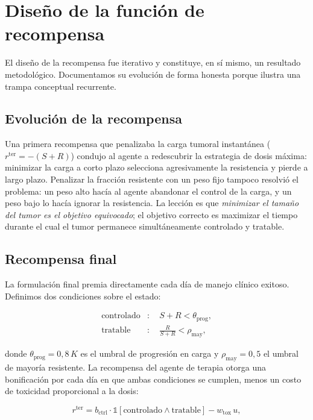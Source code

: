 \section{Diseño de la función de recompensa}
\label{sec:recompensa}

El diseño de la recompensa fue iterativo y constituye, en sí mismo, un resultado metodológico. Documentamos su evolución de forma honesta porque ilustra una trampa conceptual recurrente.

\subsection{Evolución de la recompensa}

Una primera recompensa que penalizaba la carga tumoral instantánea ($r^{\text{ter}} = -(S+R)$) condujo al agente a redescubrir la estrategia de dosis máxima: minimizar la carga a corto plazo selecciona agresivamente la resistencia y pierde a largo plazo. Penalizar la fracción resistente con un peso fijo tampoco resolvió el problema: un peso alto hacía al agente abandonar el control de la carga, y un peso bajo lo hacía ignorar la resistencia. La lección es que \emph{minimizar el tamaño del tumor es el objetivo equivocado}; el objetivo correcto es maximizar el tiempo durante el cual el tumor permanece simultáneamente controlado y tratable.

\subsection{Recompensa final}

La formulación final premia directamente cada día de manejo clínico exitoso. Definimos dos condiciones sobre el estado:

\begin{align}
  \text{controlado} &: \quad S + R < \theta_{\text{prog}}, \label{eq:controlado}\\
  \text{tratable}   &: \quad \frac{R}{S+R} < \rho_{\text{may}}, \label{eq:tratable}
\end{align}

donde $\theta_{\text{prog}} = 0{,}8\,K$ es el umbral de progresión en carga y $\rho_{\text{may}} = 0{,}5$ el umbral de mayoría resistente. La recompensa del agente de terapia otorga una bonificación por cada día en que ambas condiciones se cumplen, menos un costo de toxicidad proporcional a la dosis:

\begin{equation}
  r^{\text{ter}} = b_{\text{ctrl}}\cdot \mathbb{1}[\text{controlado} \wedge \text{tratable}] - w_{\text{tox}}\, u, \label{eq:reward-ter}
\end{equation}

